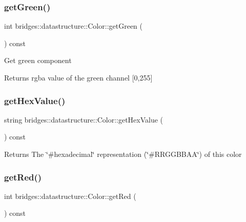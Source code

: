 \subsubsection{\texorpdfstring{get\+Green()}{getGreen()}}
{\footnotesize\ttfamily int bridges\+::datastructure\+::\+Color\+::get\+Green (\begin{DoxyParamCaption}{ }\end{DoxyParamCaption}) const\hspace{0.3cm}{\ttfamily [inline]}}

Get green component \begin{DoxyReturn}{Returns}
rgba value of the green channel \mbox{[}0,255\mbox{]} 
\end{DoxyReturn}
\mbox{\label{classbridges_1_1datastructure_1_1_color_a494648d2940754828f2054f92de031dc}} 
\subsubsection{\texorpdfstring{get\+Hex\+Value()}{getHexValue()}}
{\footnotesize\ttfamily string bridges\+::datastructure\+::\+Color\+::get\+Hex\+Value (\begin{DoxyParamCaption}{ }\end{DoxyParamCaption}) const\hspace{0.3cm}{\ttfamily [inline]}}

\begin{DoxyReturn}{Returns}
The \char`\"{}\#hexadecimal\char`\"{} representation (\char`\"{}\#\+R\+R\+G\+G\+B\+B\+A\+A\char`\"{}) of this color 
\end{DoxyReturn}
\mbox{\label{classbridges_1_1datastructure_1_1_color_a7460203f01e0437e7ce23d85bffdb7ed}} 
\subsubsection{\texorpdfstring{get\+Red()}{getRed()}}
{\footnotesize\ttfamily int bridges\+::datastructure\+::\+Color\+::get\+Red (\begin{DoxyParamCaption}{ }\end{DoxyParamCaption}) const\hspace{0.3cm}{\ttfamily [inline]}}

